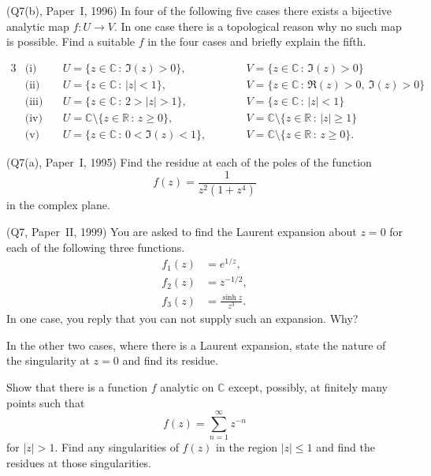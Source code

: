 \begin{question} (Q7(b), Paper~I, 1996)
In four of the following five cases
there exists a bijective analytic map $f:U\rightarrow V$.
In one case there is a topological reason why no
such map is possible. Find a suitable $f$ in the four cases
and briefly explain the fifth.

\begin{alignat*}{3}
&\text{(i)}&&\ U=\{z\in{\mathbb C}\,:\,\Im(z)>0\},&&
\qquad V=\{z\in{\mathbb C}\,:\,\Im(z)>0\}\\
&\text{(ii)}&&\ U=\{z\in{\mathbb C}\,:\,|z|<1\},&&
\qquad V=\{z\in{\mathbb C}\,:\,\Re(z)>0,\ \Im(z)>0\}\\
&\text{(iii)}&&\ U=\{z\in{\mathbb C}\,:\,2>|z|>1\},&&
\qquad V=\{z\in{\mathbb C}\,:\,|z|<1\}\\
&\text{(iv)}&&\ U={\mathbb C}\setminus\{z\in{\mathbb R}\,:\,z\geq 0\},&&
\qquad V={\mathbb C}\setminus\{z\in{\mathbb R}\,:\,|z|\geq 1\}\\ 
&\text{(v)}&&\ U=\{z\in{\mathbb C}\,:\,0<\Im(z)<1\},&&
\qquad V={\mathbb C}\setminus\{z\in{\mathbb R}\,:\,z\geq 0\}.
\end{alignat*}
\end{question}
\begin{question} (Q7(a), Paper~I, 1995) Find the residue
at each of the poles of the function
\[f(z)=\frac{1}{z^{2}(1+z^{4})}\]
in the complex plane. 
\end{question}
\begin{question} (Q7, Paper~II, 1999) You are asked to find the
Laurent expansion about $z=0$ for each of the following
three functions.
\begin{align*}
f_{1}(z)&=e^{1/z},\\
f_{2}(z)&=z^{-1/2},\\
f_{3}(z)&=\frac{\sinh z}{z^{3}}.
\end{align*}
In one case, you reply that you can not supply such
an expansion. Why?

In the other two cases, where there is a Laurent expansion,
state the nature of the singularity at $z=0$ and find its residue.

Show that there is a function $f$ analytic on ${\mathbb C}$
except, possibly, at finitely many points such that
\[f(z)=\sum_{n=1}^{\infty}z^{-n}\]
for $|z|>1$. Find any singularities of $f(z)$ in the region
$|z|\leq 1$ and find the residues at those singularities.
\end{question} 
